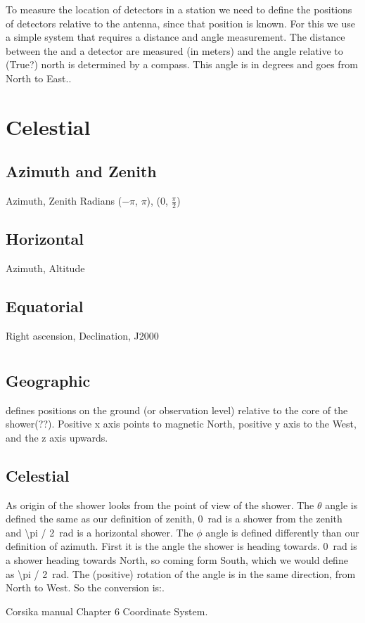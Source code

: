 To measure the location of detectors in a station we need to define the
positions of detectors relative to the \gps antenna, since that position
is known. For this we use a simple system that requires a distance and
angle measurement. The distance between the \gps and a detector are
measured (in meters) and the angle relative to (True?) north is
determined by a compass. This angle is in degrees and goes from North to
East..


\section{Celestial}

\subsection{Azimuth and Zenith}

Azimuth, Zenith
Radians ($-\pi$, $\pi$), (0, $\frac{\pi}{2}$)


\subsection{Horizontal}

Azimuth, Altitude

\subsection{Equatorial}

Right ascension, Declination, J2000


\section{\corsika}

\subsection{Geographic}

\corsika defines positions on the ground (or observation level) relative
to the core of the shower(??). Positive x axis points to magnetic North,
positive y axis to the West, and the z axis upwards.


\subsection{Celestial}

As origin of the shower \corsika looks from the point of view of the
shower. The $\theta$ angle is defined the same as our definition of
zenith, \SI{0}{\radian} is a shower from the zenith and
\SI{\pi / 2}{\radian} is a horizontal shower. The $\phi$ angle is
defined differently than our definition of azimuth. First it is the
angle the shower is heading towards. \SI{0}{\radian} is a shower heading
towards North, so coming form South, which we would define as
\SI{\pi / 2}{\radian}. The (positive) rotation of the angle is
in the same direction, from North to West. So the conversion is:.




\begin{thebibliography}{widest-label}
Corsika manual Chapter 6 Coordinate System.

\end{thebibliography}
